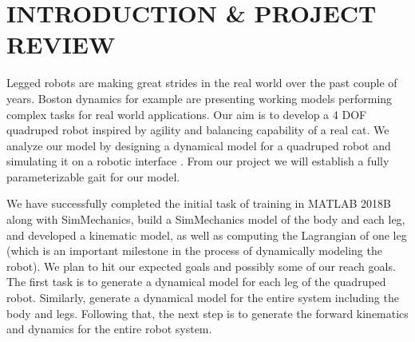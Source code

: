 \section{INTRODUCTION \& PROJECT REVIEW}
Legged robots are making great strides in the real world over the past couple of years. Boston dynamics for example are presenting working models performing complex tasks for real world applications. Our aim is to develop a 4 DOF quadruped robot inspired by agility and balancing capability of a real cat. We analyze our model by designing a dynamical model for a quadruped robot and simulating it on a robotic interface . From our project we will establish a fully parameterizable gait for our model. 

We have successfully completed the initial task of training in MATLAB 2018B along with SimMechanics, build a SimMechanics model of the body and each leg, and developed a kinematic model, as well as computing the Lagrangian of one leg (which is an important milestone in the process of dynamically modeling the robot). We plan to hit our expected goals and possibly some of our reach goals. The first task is to generate a dynamical model for each leg of the quadruped robot. Similarly, generate a dynamical model for the entire system including the body and legs. Following that, the next step is  to generate the forward kinematics and dynamics for the entire robot system.
